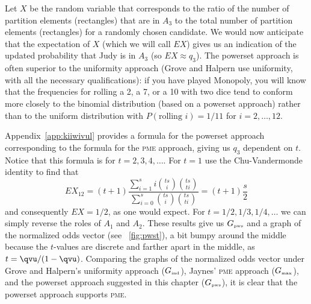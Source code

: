 \documentclass[phd,12pt,oneside]{ubcthesis}
\begin{document}
Let $X$ be the random variable that corresponds to the ratio of the
number of partition elements (rectangles) that are in $A_{3}$ to the
total number of partition elements (rectangles) for a randomly chosen
candidate. We would now anticipate that the expectation of $X$ (which
we will call $EX$) gives us an indication of the updated probability
that Judy is in $A_{3}$ (so $EX\approx{}q_{3}$). The powerset approach
is often superior to the uniformity approach (Grove and Halpern use
uniformity, with all the necessary qualifications): if you have played
Monopoly, you will know that the frequencies for rolling a 2, a 7, or
a 10 with two dice tend to conform more closely to the binomial
distribution (based on a powerset approach) rather than to the uniform
distribution with $P(\mbox{rolling }i)=1/11$ for $i=2,{\ldots},12$.

Appendix~\ref{app:kiiwivul} provides a formula for the powerset
approach corresponding to the formula for the \textsc{pme} approach,
giving us $q_{3}$ dependent on $t$. Notice that this formula is for
$t=2,3,4,\ldots$. For $t=1$ use the Chu-Vandermonde identity to find
that
\begin{equation}
  EX_{12}=(t+1)\frac{\sum_{i=1}^{s}i\binom{ts}{i}\binom{ts}{ti}}{\sum_{i=0}^{s}\binom{ts}{i}\binom{ts}{ti}}=(t+1)\frac{s}{2}  
\end{equation}
and consequently $EX=1/2$, as one would expect. For
$t=1/2,1/3,1/4,\ldots$ we can simply reverse the roles of $A_{1}$ and
$A_{2}$. These results give us $G_{\mbox{\tiny pws}}$ and a graph of
the normalized odds vector (see {\igure}~\ref{fig:pwst}), a bit bumpy
around the middle because the $t$-values are discrete and farther
apart in the middle, as $t={\qvu}/(1-{\qvu})$. Comparing the graphs of
the normalized odds vector under Grove and Halpern's uniformity
approach ($G_{\mbox{\tiny ind}}$), Jaynes' \textsc{pme} approach
($G_{\mbox{\tiny max}}$), and the powerset approach suggested in this
chapter ($G_{\mbox{\tiny pws}}$), it is clear that the powerset approach
supports \textsc{pme}.
\end{document}
